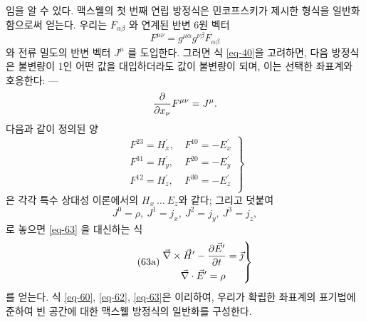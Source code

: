 \documentclass[b5paper]{article}
\begin{document}
임을 알 수 있다.
맥스웰의 첫 번째 연립 방정식은 민코프스키가 제시한 형식을 일반화함으로써 얻는다. 우리는  $F_{\alpha\beta}$ 와 연계된 반변 6원 벡터
\begin{equation} \label{eq-62}
	F^{\mu\nu} = g^{\mu\alpha} g^{\nu\beta} F_{\alpha\beta}
\end{equation}
와 전류 밀도의 반변 벡터 $J^\mu$
를 도입한다. 그러면 식 \eqref{eq-40}을 고려하면, 다음 방정식은  불변량이 1인 어떤 값을 대입하더라도 값이 불변량이 되며, 이는 선택한 좌표계와 호응한다: ---
\begin{equation} \label{eq-63}
	{\frac{{\partial}{}}{{\partial}{x_\nu}}} F^{\mu\nu} = J^\mu.
\end{equation}
다음과 같이 정의된 양
\begin{equation} \label{eq-64}
\left.
	\begin{aligned}
	F^{2 3}=H_x^\prime, &~F^{1 0} = -E_x^\prime\\
	F^{3 1}=H_y^\prime, &~F^{2 0} = -E_y^\prime\\
	F^{1 2}=H_z^\prime, &~F^{3 0} = -E_z^\prime\\
	\end{aligned}
\right\}
\end{equation}
은 각각 특수 상대성 이론에서의 $H_x~\dots~E_z$와 같다; 그리고 덧붙여
\begin{equation*}
	J^0 = \rho,~J^1 = j_x,~J^2 = j_y,~J^3 = j_z,
\end{equation*}로 놓으면 \eqref{eq-63} 을 대신하는 식
\begin{equation} \tag{63a} \label{eq-63a}
	\left.
	\begin{gathered}
	\vec{\nabla}\times \vec{H}^\prime-{\frac{{\partial}{\vec{E}^\prime}}{{\partial}{t}}}=\vec{\jmath} \\
	\vec{\nabla}\cdot \vec{E}^\prime = \rho
	\end{gathered}
	\right\}
\end{equation}
를 얻는다. 식  \eqref{eq-60}, \eqref{eq-62}, \eqref{eq-63}은 이리하여, 우리가 확립한 좌표계의 표기법에 준하여 빈 공간에 대한 맥스웰 방정식의 일반화를 구성한다.
\end{document}
